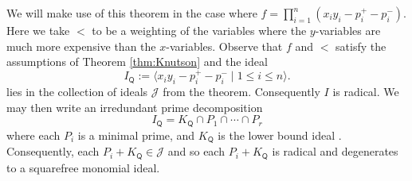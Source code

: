 \documentclass[ALCO,published]{cedram}
\numberwithin{equation}{section}
\newcommand{\1}{^{-1}}
\def\Q{\mathsf{Q}}
\begin{document}

We will make use of this theorem in the case where $f = \prod_{i=1}^n (x_iy_i-p_i^+-p_i^-)$. Here we take $<$ to be a weighting of the variables where the $y$-variables are much more expensive than the $x$-variables. Observe that $f$ and $<$ satisfy the assumptions of Theorem \ref{thm:Knutson} and the ideal
\[ 
I_\Q := \langle x_iy_i-p_i^+-p_i^-\mid 1\leq i\leq n \rangle.
\]
lies in the collection of ideals $\mathcal{J}$ from the theorem. 
Consequently $I$ is radical. We may then write an irredundant prime decomposition 
\begin{equation}\label{primeDecompositionl}
I_\Q = K_\Q\cap P_1\cap\cdots \cap P_r
\end{equation}
where each $P_i$ is a minimal prime, and $K_\Q$ is the lower bound ideal \cite[Lemma 5.7]{BMRS15}. Consequently, each $P_i+K_\Q\in \mathcal{J}$ and so each $P_i+K_\Q$ is radical and degenerates to a squarefree monomial ideal. 
\end{document}
